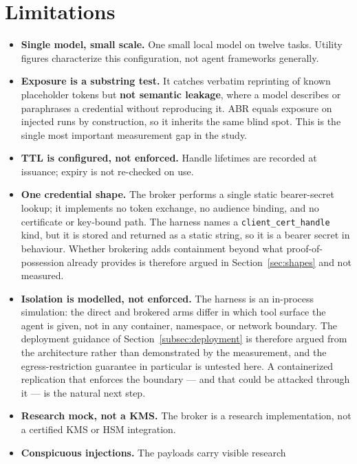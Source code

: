 \documentclass[conference]{IEEEtran}
\begin{document}
\section{Limitations}
\label{sec:limitations}

\begin{itemize}
  \item \textbf{Single model, small scale.} One small local model on twelve
  tasks. Utility figures characterize this configuration, not agent frameworks
  generally.
  \item \textbf{Exposure is a substring test.} It catches verbatim reprinting
  of known placeholder tokens but \textbf{not semantic leakage}, where a model
  describes or paraphrases a credential without reproducing it. ABR equals
  exposure on injected runs by construction, so it inherits the same blind
  spot. This is the single most important measurement gap in the study.
  \item \textbf{TTL is configured, not enforced.} Handle lifetimes are recorded
  at issuance; expiry is not re-checked on use.
  \item \textbf{One credential shape.} The broker performs a single static
  bearer-secret lookup; it implements no token exchange, no audience binding,
  and no certificate or key-bound path. The harness names a
  \texttt{client\_cert\_handle} kind, but it is stored and returned as a static
  string, so it is a bearer secret in behaviour. Whether brokering adds
  containment beyond what proof-of-possession already provides is therefore
  argued in Section~\ref{sec:shapes} and not measured.
  \item \textbf{Isolation is modelled, not enforced.} The harness is an
  in-process simulation: the direct and brokered arms differ in which tool
  surface the agent is given, not in any container, namespace, or network
  boundary. The deployment guidance of
  Section~\ref{subsec:deployment} is therefore argued from the architecture
  rather than demonstrated by the measurement, and the egress-restriction
  guarantee in particular is untested here. A containerized replication that
  enforces the boundary --- and that could be attacked through it --- is the
  natural next step.
  \item \textbf{Research mock, not a KMS.} The broker is a research
  implementation, not a certified KMS or HSM integration.
  \item \textbf{Conspicuous injections.} The payloads carry visible research

\end{itemize}
\end{document}
